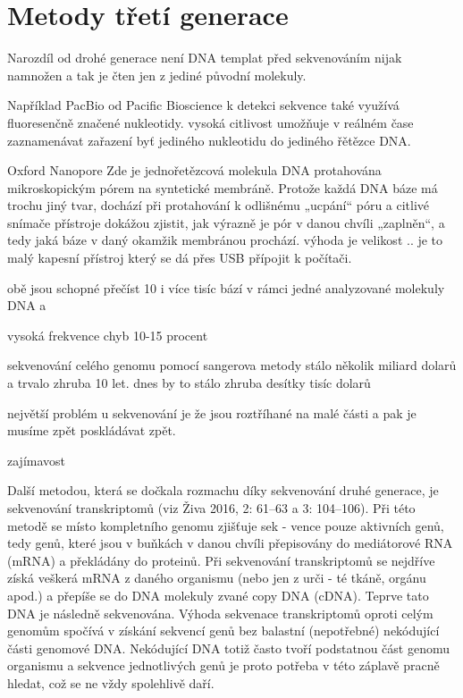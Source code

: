 \documentclass[czech,DP]{thesiskiv}
\begin{document}
\section{Metody třetí generace}
Narozdíl od drohé generace není DNA templat před sekvenováním nijak namnožen a tak je čten jen z jediné původní molekuly.

Například PacBio od Pacific Bioscience
k detekci sekvence také využívá fluoresenčně značené nukleotidy. 
vysoká citlivost umožňuje v reálném čase zaznamenávat zařazení byť jediného nukleotidu do jediného řětězce DNA.

Oxford Nanopore
 Zde je jednořetězcová molekula DNA protahována mikroskopickým pórem na syntetické membráně.
Protože každá DNA báze má trochu jiný
tvar, dochází při protahování k odlišnému
„ucpání“ póru a citlivé snímače přístroje
dokážou zjistit, jak výrazně je pór v danou
chvíli „zaplněn“, a tedy jaká báze v daný
okamžik membránou prochází.
výhoda je velikost .. je to malý kapesní přístroj který se dá přes USB přípojit k počítači. 

obě jsou schopné přečíst 10 i více tisíc bází v rámci jedné analyzované molekuly DNA a 

vysoká frekvence chyb 10-15 procent

sekvenování celého genomu pomocí sangerova metody stálo několik miliard dolarů a trvalo zhruba 10 let.
dnes by to stálo zhruba desítky tisíc dolarů 

největší problém u sekvenování je že jsou roztříhané na malé části a pak je musíme zpět poskládávat zpět.


zajímavost

Další metodou, která se dočkala rozmachu díky sekvenování druhé generace, je
sekvenování transkriptomů (viz Živa 2016,
2: 61–63 a 3: 104–106). Při této metodě se
místo kompletního genomu zjišťuje sek -
vence pouze aktivních genů, tedy genů,
které jsou v buňkách v danou chvíli přepisovány do mediátorové RNA (mRNA)
a překládány do proteinů. Při sekvenování
transkriptomů se nejdříve získá veškerá
mRNA z daného organismu (nebo jen z urči -
té tkáně, orgánu apod.) a přepíše se do DNA
molekuly zvané copy DNA (cDNA). Teprve
tato DNA je následně sekvenována. Výhoda sekvenace transkriptomů oproti celým
genomům spočívá v získání sekvencí genů
bez balastní (nepotřebné) nekódující části
genomové DNA. Nekódující DNA totiž často tvoří podstatnou část genomu organismu a sekvence jednotlivých genů je proto
potřeba v této záplavě pracně hledat, což
se ne vždy spolehlivě daří. 
\end{document}
